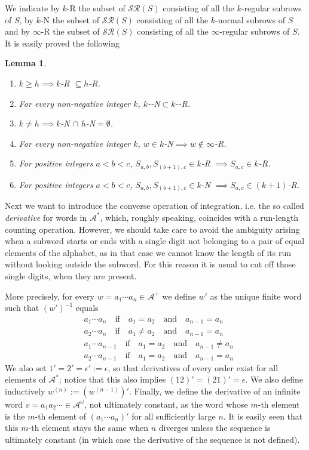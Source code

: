 \documentclass[10pt,a4paper]{article}
\newtheorem{lemma}{Lemma}
\begin{document}
We indicate by $k$-R the subset of $\mathcal{SR}(S)$ consisting of all the $k$-regular subrows of $S$, by $k$-N the subset of $\mathcal{SR}(S)$ consisting of all the $k$-normal subrows of $S$ and by $\infty$-R the subset of $\mathcal{SR}(S)$ consisting of all the $\infty$-regular subrows of $S$.
It is easily proved the following
\begin{lemma}
\begin{enumerate}
\item $k\ge h \implies k$-\emph{R} $\subseteq h$-\emph{R}.
\item For every non-negative integer $k$, $k$-\emph{-N}$\subset k$-\emph{-R}.
\item $k\ne h \implies k$-\emph{N} $\cap\,\, h$-\emph{N}$=\emptyset$.
\item For every non-negative integer $k$, $w\in k$-\emph{N}$ \implies w \notin \infty$-\emph{R}.
\item For positive integers $a<b<c$, $S_{a,b}, S_{(b+1),c} \in k$-\emph{R} $\implies S_{a,c}\in k$-\emph{R}.
\item For positive integers $a<b<c$, $S_{a,b}, S_{(b+1),c} \in k$-\emph{N} $\implies S_{a,c}\in (k+1)$-\emph{R}.
\end{enumerate} 
\label{Syntax}
\end{lemma}
Next we want to introduce the converse operation of integration, i.e. the so called \textit{derivative} for words in $\mathcal{A}^*$, which, roughly speaking, coincides with a run-length counting operation. However, we should take care to avoid the ambiguity arising when a subword starts or ends with a single digit not belonging to a pair of equal elements of the alphabet, as in that case we cannot know the length of its run without looking outside the subword. For this reason it is usual \cite{dekking1997long} to cut off those single digits, when they are present. 

More precisely, for every $w=a_1\cdots a_n\in\mathcal{A}^+$ we define $w'$ as the unique finite word such that $(w')^{-1}$ equals
\begin{align*}
& a_1\cdots a_n\quad \text{if}\quad a_1= a_2\quad \text{and} \quad a_{n-1}= a_n\\
& a_2\cdots a_n \quad \text{if}\quad a_1\ne a_2\quad \text{and}\quad a_{n-1}= a_n\\
& a_1\cdots a_{n-1} \quad \text{if}\quad a_1= a_2\quad \text{and}\quad a_{n-1}\ne a_n\\
& a_2\cdots a_{n-1} \quad \text{if}\quad a_1= a_2\quad \text{and}\quad a_{n-1}= a_n
\end{align*}  
We also set $1'=2'=\epsilon':=\epsilon$, so that derivatives of every order exist for all elements of $\mathcal{A}^*$; notice that this also implies $(12)'=(21)'=\epsilon$. We also define inductively $w^{(n)}:=(w^{(n-1)})'$. Finally, we define the derivative of an infinite word $v=a_1a_2\cdots \in\mathcal{A}^{\omega}$, not ultimately constant, as the word whose $m$-th element is the $m$-th element of $(a_1\cdots a_{n})'$ for all sufficiently large $n$. It is easily seen that this $m$-th element stays the same when $n$ diverges unless the sequence is ultimately constant (in which case the derivative of the sequence is not defined). 
\end{document}
